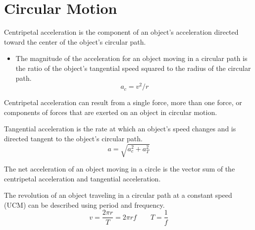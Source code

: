 \documentclass[../mech.tex]{subfiles}
\begin{document}
\section{Circular Motion}
Centripetal acceleration is the component of an object's acceleration directed toward the center of the object's circular path.
\begin{itemize}
    \item The magnitude of the acceleration for an object moving in a circular path is the ratio of the object's tangential speed squared to the radius of the circular path.
    \[ a_c=v^2/r \]
\end{itemize}
Centripetal acceleration can result from a single force, more than one force, or components of forces that are exerted on an object in circular motion.

Tangential acceleration is the rate at which an object's speed changes and is directed tangent to the object's circular path. 
\[a=\sqrt{a_c^2+a_T^2}\]

The net acceleration of an object moving in a circle is the vector sum of the centripetal acceleration and tangential acceleration.

The revolution of an object traveling in a circular path at a constant speed (UCM) can be described using period and frequency.
\[v=\frac{2\pi r}{T}=2\pi r f \qquad T=\frac{1}{f}\]
\end{document}
